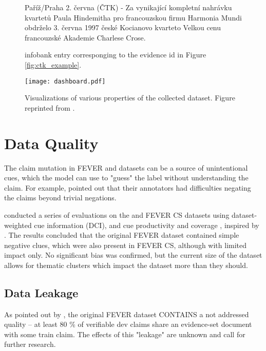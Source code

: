 \begin{figure}[h!]
    \begin{framed}
        \vspace{-1mm}
        Paříž/Praha 2. června (ČTK) - Za vynikající kompletní nahrávku kvartetů Paula Hindemitha pro francouzskou firmu Harmonia Mundi obdrželo 3. června 1997 české Kocianovo kvarteto Velkou cenu francouzské Akademie Charlese Crose.
    \end{framed}
    \caption[\CTK{} Infobank Example]{\CTK{} infobank entry corresponging to the evidence id in Figure \ref{fig:ctk_example}.}
\end{figure}

\begin{figure}[h!]
  \texttt{[image: dashboard.pdf]}
  \caption[Visualizations of Properties of the Collected Dataset]{Visualizations of various properties of the collected \CTK{} dataset. Figure reprinted from \citet{ullrich}.}
  \label{fig:dashboard}
\end{figure}

\section{Data Quality}

The claim mutation in FEVER and \CTK{} datasets can be a source of unintentional cues, which the model can use to "guess" the label without understanding the claim.
For example, \citet{fever} pointed out that their annotators had difficulties negating the claims beyond trivial negations.

\citet{rypar} conducted a series of evaluations on the \CTK{} and FEVER CS datasets using dataset-weighted cue information (DCI), and cue productivity and coverage \citep{niven-probing}, inspired by \citet{derczynski-etal-2020-maintaining}.
The results concluded that the original FEVER dataset contained simple negative clues, which were also present in FEVER CS, although with limited impact only. No significant bias was confirmed, but the current size of the \CTK{} dataset allows for thematic clusters which impact the dataset more than they should. 

\subsection{Data Leakage}
\label{subsec:data_leakage}

As pointed out by \citet{ullrich}, the original FEVER dataset CONTAINS a not addressed quality -- at least 80 \% of verifiable dev claims share an evidence-set document with some train claim. The effects of this "leakage" are unknown and call for further research.


